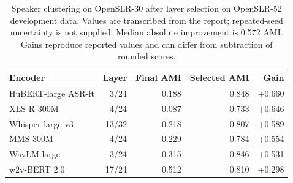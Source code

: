 \begin{table}[t]
\centering\small
\begin{tabular}{lrrrr}\toprule
Encoder & Layer & Final AMI & Selected AMI & Gain \\\midrule
HuBERT-large ASR-ft & 3/24 & 0.188 & 0.848 & +0.660 \\
XLS-R-300M & 4/24 & 0.087 & 0.733 & +0.646 \\
Whisper-large-v3 & 13/32 & 0.218 & 0.807 & +0.589 \\
MMS-300M & 4/24 & 0.229 & 0.784 & +0.554 \\
WavLM-large & 3/24 & 0.315 & 0.846 & +0.531 \\
w2v-BERT 2.0 & 17/24 & 0.512 & 0.810 & +0.298 \\
\bottomrule\end{tabular}
\caption{Speaker clustering on OpenSLR-30 after layer selection on OpenSLR-52 development data. Values are transcribed from the report; repeated-seed uncertainty is not supplied. Median absolute improvement is 0.572 AMI. Gains reproduce reported values and can differ from subtraction of rounded scores.}
\label{tab:layer-transfer}\end{table}

